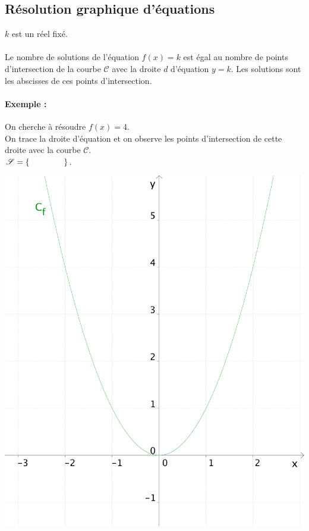 \medskip


\subsection{Résolution graphique d'équations}

$k$ est un réel fixé. \\

\noindent
{} \\

Le nombre de solutions de l'équation $f(x)=k$ est égal au nombre de
points d'intersection de la courbe $\mathscr{C}$ avec la droite $d$
d'équation $y=k$. Les solutions sont les abscisses de ces points
d'intersection. 

\paragraph{Exemple :} 
\begin{minipage}[t]{0.55\linewidth}
  On cherche à résoudre $f(x)=4$. \\
  On trace la droite d'équation \hspace{1.5cm} et
  on observe les points d'intersection de cette droite avec la courbe
  $\mathscr{C}$. \\[1ex]
  $\mathscr{S}=\{\hspace{1.5cm}\}$. 
\end{minipage}
\qquad
\begin{minipage}[c]{0.25\linewidth}
  \includegraphics[width=\textwidth]{F_reseq_f}
\end{minipage}

